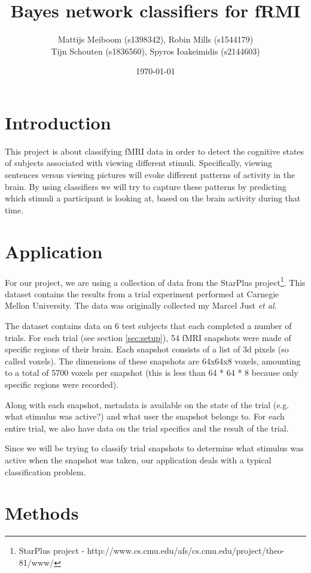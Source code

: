 \documentclass[a4paper, 11pt]{scrartcl}
\title{\Large Bayes network classifiers for fRMI}
\author{\small Mattijs Meiboom (s1398342), Robin Mills (s1544179)\\
			\small Tijn Schouten (s1836560), Spyros Ioakeimidis (s2144603)}
\date{\small \today}
\begin{document}
\maketitle

\thispagestyle{empty}

\section{Introduction}

This project is about classifying fMRI data in order to detect the cognitive states of subjects associated with viewing different stimuli. Specifically, viewing sentences versus viewing pictures will evoke different patterns of activity in the brain. By using classifiers we will try to capture these patterns by predicting which stimuli a participant is looking at, based on the brain activity during that time.

\section{Application}

For our project, we are using a collection of data from the StarPlus project\footnote{StarPlus project - http://www.cs.cmu.edu/afs/cs.cmu.edu/project/theo-81/www/}. This dataset contains the results from a trial experiment performed at Carnegie Mellon University. The data was originally collected my Marcel Just \textit{et al}.

The dataset contains data on 6 test subjects that each completed a number of trials. For each trial (see section \ref{sec:setup}), 54 fMRI snapshots were made of specific regions of their brain. Each snapshot consists of a list of 3d pixels (so called voxels). The dimensions of these snapshots are 64x64x8 voxels, amounting to a total of 5700 voxels per snapshot (this is less than 64 * 64 * 8 because only specific regions were recorded).

Along with each snapshot, metadata is available on the state of the trial (e.g. what stimulus was active?) and what user the snapshot belongs to. For each entire trial, we also have data on the trial specifics and the result of the trial.

Since we will be trying to classify trial snapshots to determine what stimulus was active when the snapshot was taken, our application deals with a typical classification problem.

\section{Methods}
\end{document}
